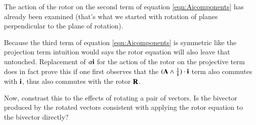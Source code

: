 \documentclass{article}      %
\begin{document}
The action of the rotor on the second term of equation \ref{eqn:Aicomponents} has already been examined (that's what we started with rotation of planes perpendicular to the plane of rotation).

Because the third term of equation \ref{eqn:Aicomponents} is symmetric like the projection term intuition would says the rotor equation will
also leave that untouched.  Replacement of $\alpha \mathbf{i}$ for the action of the rotor on the projective term does in fact prove this if
one first observes that the $(\mathbf{A} \wedge \frac{1}{\mathbf{i}}) \cdot \mathbf{i}$ term also commutes with $\mathbf{i}$, thus also commutes with the rotor $\mathbf{R}$.

Now, constrast this to the effects of rotating a pair of vectors.  Is the bivector produced by the rotated vectors consistent with applying
the rotor equation to the bivector directly?

\end{document}
